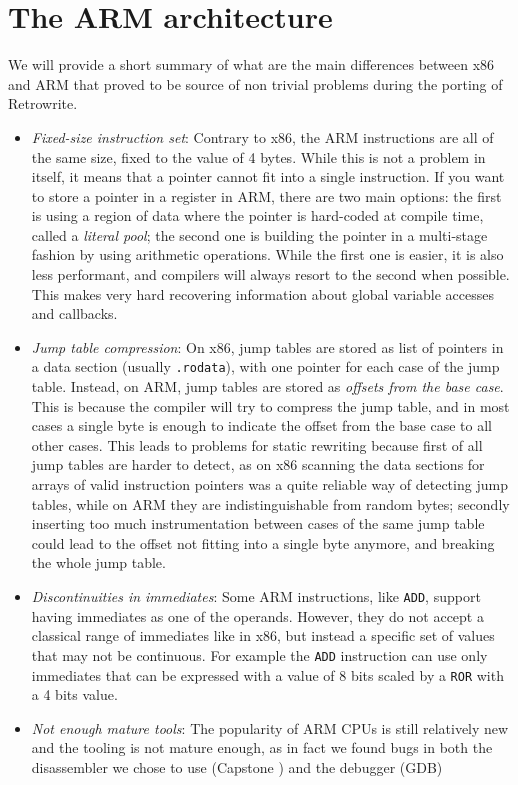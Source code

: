 \documentclass[a4paper,11pt,oneside]{report}
\begin{document}
\section{The ARM architecture}
We will provide a short summary of what are the main differences between x86 
and ARM that proved to be source of non trivial problems during the porting of 
Retrowrite.
\begin{itemize}
	\item \emph{Fixed-size instruction set}: Contrary to x86, the ARM 
		instructions are all of the same size, fixed to the value of 4 bytes.  
		While this is not a problem in itself, it means that a pointer cannot 
		fit into a single instruction. If you want to store a pointer in a 
		register in ARM, there are two main options: the first is using a 
		region of data where the pointer is hard-coded at compile time, called 
		a \emph{literal pool}; the second one is building the pointer in a 
		multi-stage fashion by using arithmetic operations.  While the first 
		one is easier, it is also less performant, and compilers will always 
		resort to the second when possible. This makes very hard recovering 
		information about global variable accesses and callbacks.
	\item \emph{Jump table compression}: On x86, jump tables are stored as list 
		of pointers in a data section (usually \texttt{.rodata}), with one 
		pointer for each case of the jump table. Instead, on ARM, jump tables 
		are stored as \emph{offsets from the base case}. This is because the 
		compiler will try to compress the jump table, and in most cases a 
		single byte is enough to indicate the offset from the base case to all 
		other cases. This leads to problems for static rewriting because first 
		of all jump tables are harder to detect, as on x86 scanning the data 
		sections for arrays of valid instruction pointers was a quite reliable 
		way of detecting jump tables, while on ARM they are indistinguishable 
		from random bytes; secondly inserting too much instrumentation between 
		cases of the same jump table could lead to the offset not fitting into 
		a single byte anymore, and breaking the whole jump table.
	\item \emph{Discontinuities in immediates}: Some ARM instructions, like 
		\texttt{ADD}, support having immediates as one of the operands.  
		However, they do not accept a classical range of immediates like in 
		x86, but instead a specific set of values that may not be continuous.  
		For example the \texttt{ADD} instruction can use only immediates that 
		can be expressed with a value of 8 bits scaled by a \texttt{ROR} with a
		4 bits value.
	\item \emph{Not enough mature tools}: The popularity of ARM CPUs is still 
		relatively new and the tooling is not mature enough, as in fact we 
		found bugs in both the disassembler we chose to use (Capstone 
		\cite{capstone}) and the debugger (GDB)
\end{itemize}
\end{document}
